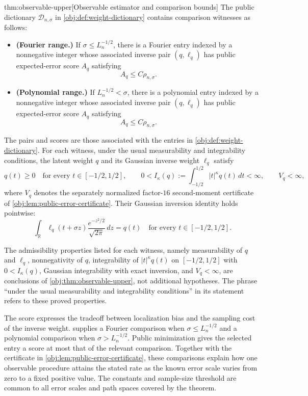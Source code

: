 \begin{theoremv}{thm:observable-upper}[Observable estimator and comparison bounds]
The public dictionary \(\mathcal D_{n,\sigma}\) in \cref{obj:def:weight-dictionary} contains comparison witnesses as follows:
\begin{itemize}
\item \textbf{(Fourier range.)} If \(\sigma\le L_n^{-1/2}\), there is a Fourier entry indexed by a nonnegative integer whose associated inverse pair \((q,\ell_q)\) has public expected-error score \(A_q\) satisfying
\[
A_q\le C\rho_{n,\sigma}.
\]
\item \textbf{(Polynomial range.)} If \(L_n^{-1/2}<\sigma\), there is a polynomial entry indexed by a nonnegative integer whose associated inverse pair \((q,\ell_q)\) has public expected-error score \(A_q\) satisfying
\[
A_q\le C\rho_{n,\sigma}.
\]
\end{itemize}
The pairs and scores are those associated with the entries in \cref{obj:def:weight-dictionary}. For each witness, under the usual measurability and integrability conditions, the latent weight \(q\) and its Gaussian inverse weight \(\ell_q\) satisfy
\[
q(t)\ge0
\quad\text{for every }t\in[-1/2,1/2],
\qquad
0<I_\kappa(q)
:=\int_{-1/2}^{1/2}|t|^\kappa q(t)\,dt<\infty,
\qquad
V_q<\infty,
\]
where \(V_q\) denotes the separately normalized factor-\(16\) second-moment certificate of \cref{obj:lem:public-error-certificate}. Their Gaussian inversion identity holds pointwise:
\[
\int_{\mathbb R}\ell_q(t+\sigma z)
       \frac{e^{-z^2/2}}{\sqrt{2\pi}}\,dz
=q(t)
\quad\text{for every }t\in[-1/2,1/2].
\]
\end{theoremv}

The admissibility properties listed for each witness, namely measurability of \(q\) and \(\ell_q\), nonnegativity of \(q\), integrability of \(|t|^\kappa q(t)\) on \([-1/2,1/2]\) with \(0<I_\kappa(q)\), Gaussian integrability with exact inversion, and \(V_q<\infty\), are conclusions of \cref{obj:thm:observable-upper}, not additional hypotheses. The phrase ``under the usual measurability and integrability conditions'' in its statement refers to these proved properties.

The score expresses the tradeoff between localization bias and the sampling cost of the inverse weight.  supplies a Fourier comparison when \(\sigma\le L_n^{-1/2}\) and a polynomial comparison when \(\sigma>L_n^{-1/2}\). Public minimization gives the selected entry a score at most that of the relevant comparison. Together with the certificate in \cref{obj:lem:public-error-certificate}, these comparisons explain how one observable procedure attains the stated rate as the known error scale varies from zero to a fixed positive value. The constants and sample-size threshold are common to all error scales and path spaces covered by the theorem.

